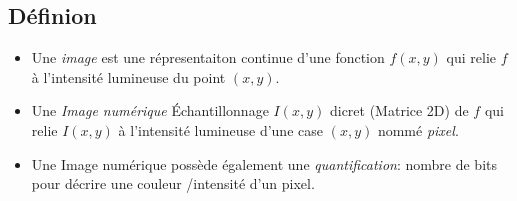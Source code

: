 \documentclass[main.tex]{subfiles}
\begin{document}


\subsection{Définion}
\begin{defin}
  \begin{itemize}
  \item   Une \emph{image} est une répresentaiton continue d'une fonction $f(x,y)$ qui relie $f$ à l'intensité lumineuse du point $(x,y)$.
  \item Une \emph{Image numérique} Échantillonnage $I(x,y)$ dicret (Matrice 2D) de $f$ qui relie $I(x,y)$ à l'intensité lumineuse d'une case $(x,y)$ nommé \emph{pixel}.
  \item Une Image numérique possède également une \emph{quantification}: nombre de  bits pour décrire une couleur /intensité d'un pixel.
  \end{itemize}
\end{defin}
\end{document}

